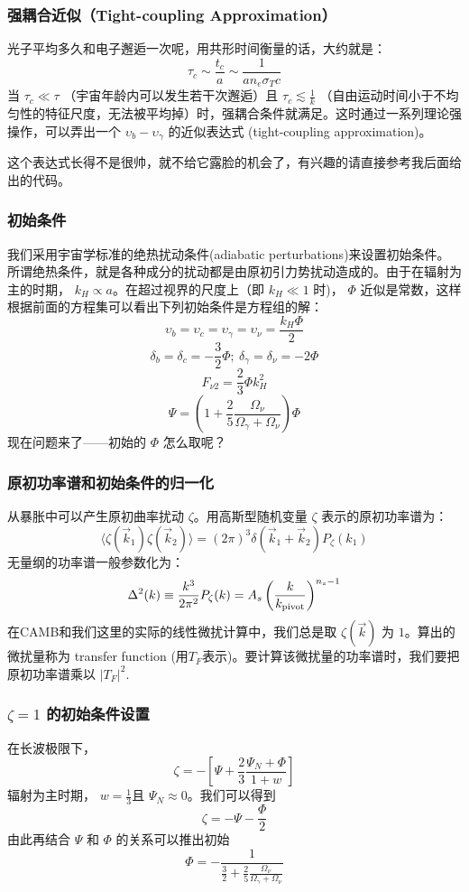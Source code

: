 \documentclass[CJK,13pt]{beamer}
\begin{document}
    \begin{frame}
      \frametitle{强耦合近似（Tight-coupling Approximation）}
      光子平均多久和电子邂逅一次呢，用共形时间衡量的话，大约就是：
      $$\tau_c \sim \frac{t_c}{a} \sim \frac{1}{a n_e\sigma_Tc} $$
      当 $\tau_c \ll \tau $ （宇宙年龄内可以发生若干次邂逅）且 $\tau_c \lesssim \frac{1}{k}$ （自由运动时间小于不均匀性的特征尺度，无法被平均掉）时，强耦合条件就满足。这时通过一系列理论强操作，可以弄出一个 $\upsilon_b - \upsilon_\gamma$  的近似表达式 (tight-coupling approximation)。


      
      这个表达式长得不是很帅，就不给它露脸的机会了，有兴趣的请直接参考我后面给出的代码。
    \end{frame}    

    
    \begin{frame}
      \frametitle{初始条件}
      我们采用宇宙学标准的绝热扰动条件(adiabatic perturbations)来设置初始条件。所谓绝热条件，就是各种成分的扰动都是由原初引力势扰动造成的。由于在辐射为主的时期， $k_H\propto a$。在超过视界的尺度上（即 $k_H\ll 1$ 时)， $\Phi$ 近似是常数，这样根据前面的方程集可以看出下列初始条件是方程组的解：
        $$ \upsilon_{b}=  \upsilon_{c}= \upsilon_{\gamma}= \upsilon_{\nu} = \frac{k_H\Phi}{2}$$
        $$\delta_b = \delta_c = -\frac{3}{2}\Phi;\ \delta_\gamma = \delta_\nu = -2\Phi$$
        $$F_{\nu 2} = \frac{2}{3}\Phi k_H^2 $$
        $$\Psi = \left(1 + \frac{2}{5}\frac{\Omega_\nu}{\Omega_\gamma+\Omega_\nu}\right)\Phi $$
        现在问题来了——初始的 $\Phi$ 怎么取呢？
    \end{frame}    


    \begin{frame}
      \frametitle{原初功率谱和初始条件的归一化}
      从暴胀中可以产生原初曲率扰动 $\zeta$。用高斯型随机变量 $\zeta$ 表示的原初功率谱为：
      $$\langle \zeta(\vec{k}_1) \zeta(\vec{k}_2)\rangle = (2\pi)^3\delta(\vec{k}_1+\vec{k}_2)P_\zeta(k_1)$$
      无量纲的功率谱一般参数化为：
      $$\Delta^2(k)\equiv \frac{k^3}{2\pi^2}P_\zeta(k) = A_s\left(\frac{k}{k_{\rm pivot}}\right)^{n_s-1}$$
      在CAMB和我们这里的实际的线性微扰计算中，我们总是取 $\zeta(\vec{k})$ 为 $1$。算出的微扰量称为 transfer function (用$T_F$表示)。要计算该微扰量的功率谱时，我们要把原初功率谱乘以 $|T_F|^2$.
    \end{frame}

    \begin{frame}
      \frametitle{$\zeta=1$ 的初始条件设置}
      在长波极限下，
      $$\zeta = -\left[\Psi+\frac{2}{3}\frac{\Psi_N+\Phi}{1+w}\right]$$
      辐射为主时期， $w=\frac{1}{3}$且 $\Psi_N\approx 0$。我们可以得到
      $$\zeta = -\Psi - \frac{\Phi}{2}$$
      由此再结合 $\Psi $ 和 $\Phi$ 的关系可以推出初始
      $$\Phi = -\frac{1}{\frac{3}{2}+\frac{2}{5}\frac{\Omega_\nu}{\Omega_\gamma+\Omega_\nu}}$$
    \end{frame}    
    
\end{document}
